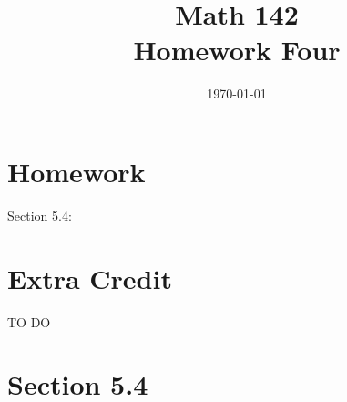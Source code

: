 \documentclass{exam}
\author{}
\date{\today}
\title{Math 142 \\ Homework Four}
\begin{document}
  \maketitle

  \section{Homework}
  Section 5.4: 

  \section{Extra Credit}
  TO DO

  \ifprintanswers

    \section{Section 5.4}
\end{document}
